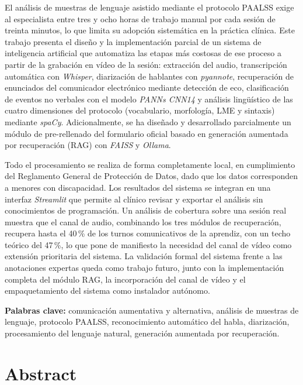 El análisis de muestras de lenguaje asistido mediante el protocolo \ac{PAALSS} exige
al especialista entre tres y ocho horas de trabajo manual por cada sesión de treinta
minutos, lo que limita su adopción sistemática en la práctica clínica. Este trabajo
presenta el diseño y la implementación parcial de un sistema de inteligencia artificial
que automatiza las etapas más costosas de ese proceso a partir de la grabación en
vídeo de la sesión: extracción del audio, transcripción automática con \emph{Whisper},
diarización de hablantes con \emph{pyannote}, recuperación de enunciados del
comunicador electrónico mediante detección de eco, clasificación de eventos no verbales
con el modelo \emph{PANNs CNN14} y análisis lingüístico de las cuatro dimensiones del
protocolo (vocabulario, morfología, \ac{LME} y sintaxis) mediante \emph{spaCy}.
Adicionalmente, se ha diseñado y desarrollado parcialmente un módulo de pre-rellenado
del formulario oficial basado en generación aumentada por recuperación (\ac{RAG})
con \emph{FAISS} y \emph{Ollama}.

Todo el procesamiento se realiza de forma completamente local, en cumplimiento del
Reglamento General de Protección de Datos, dado que los datos corresponden a menores
con discapacidad. Los resultados del sistema se integran en una interfaz \emph{Streamlit}
que permite al clínico revisar y exportar el análisis sin conocimientos de programación.
Un análisis de cobertura sobre una sesión real muestra que el canal de audio, combinando
los tres módulos de recuperación, recupera hasta el 40\,\% de los turnos comunicativos
de la aprendiz, con un techo teórico del 47\,\%, lo que pone de manifiesto la necesidad
del canal de vídeo como extensión prioritaria del sistema. La validación formal del
sistema frente a las anotaciones expertas queda como trabajo futuro, junto con la
implementación completa del módulo \ac{RAG}, la incorporación del canal de vídeo y el
empaquetamiento del sistema como instalador autónomo.

\vspace{1em}
\noindent\textbf{Palabras clave:} comunicación aumentativa y alternativa, análisis
de muestras de lenguaje, protocolo \ac{PAALSS}, reconocimiento automático del habla,
diarización, procesamiento del lenguaje natural, generación aumentada por recuperación.

\cleardoublepage
\thispagestyle{plain}
\chapter*{Abstract}

